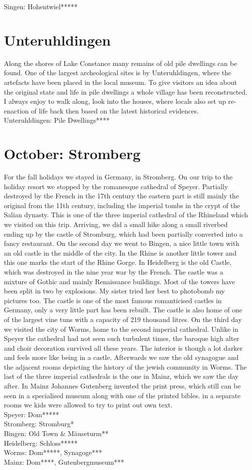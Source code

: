 Singen: Hohentwiel*****

\section{Unteruhldingen}
\label{1996:Unteruhldingen}

Along the shores of Lake Constance many remains of old pile dwellings can be found. One of the largest archeological sites is by Unteruhldingen, where the artefacts have been placed in the local museum. To give visitors an idea about the original state and life in pile dwellings a whole village has been reconstructed. I always enjoy to walk along, look into the houses, where locals also set up re-enaction of life back then based on the latest historical evidences.\\

Unteruhldingen: Pile Dwellings****


\section{October: Stromberg}
\label{1996:Stromberg}

For the fall holidays we stayed in Germany, in Stromberg. On our trip to the holiday resort we stopped by the romanesque cathedral of Speyer. Partially destroyed by the French in the 17th century the eastern part is still mainly the original from the 11th century, including the imperial tombs in the crypt of the Salian dynasty. This is one of the three imperial cathedral of the Rhineland which we visited on this trip. Arriving, we did a small hike along a small riverbed ending up by the castle of Stromburg, which had been partially converted into a fancy restaurant. On the second day we went to Bingen, a nice little town with an old castle in the middle of the city. In the Rhine is another little tower and this one marks the start of the Rhine Gorge. In Heidelberg is the old Castle, which was destroyed in the nine year war by the French. The castle was a mixture of Gothic and mainly Renaissance buildings. Most of the towers have been split in two by explosions. My sister tried her best to photobomb my pictures too. The castle is one of the most famous romanticised castles in Germany, only a very little part has been rebuilt. The castle is also home of one of the largest vine tuns with a capacity of 219 thousand litres. On the third day we visited the city of Worms, home to the second imperial cathedral. Unlike in Speyer the cathedral had not seen such turbulent times, the baroque high alter and choir decoration survived all these years. The interior is though a lot darker and feels more like being in a castle. Afterwards we saw the old synagogue and the adjacent rooms depicting the history of the jewish community in Worms. The last of the three imperial cathedrals is the one in Mainz, which we saw the day after. In Mainz Johannes Gutenberg invented the print press, which still can be seen in a specialised museum along with one of the printed bibles. in a separate rooms we kids were allowed to try to print out own text.\\ 

Speyer: Dom*****\\
Stromberg: Stromburg*\\
Bingen: Old Town \& M\"auseturm**\\
Heidelberg: Schloss*****\\
Worms: Dom*****, Synagoge***\\
Mainz: Dom****, Gutenbergmuseum***